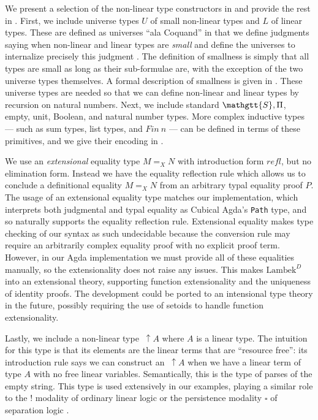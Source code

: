 \documentclass[acmsmall,nonacm]{acmart}
\renewcommand{\Sigma}{\mathgtt{S}}
\newcommand{\theoryabbv}{$\textrm{Lambek}^D$\xspace}
\newcommand{\ltonl}[1]{~\uparrow #1}
\begin{document}
We present a selection of the non-linear type constructors in
 and provide the rest in
\fi.  First,
we include universe types $U$ of small non-linear types and $L$ of linear
types. These are defined as
universes ``ala Coquand'' in that we define judgments saying when
non-linear and linear types are \emph{small} and define the universes to internalize
precisely this judgment \cite{coquandPresheafModel,lmcs:7713}. The definition of
smallness is simply that all types are small as long as their sub-formulae are,
with the exception of the two universe types themselves. A formal
description of smallness is given in
\fi. These universe
types are needed so that we can define non-linear and linear types by recursion on natural
numbers.
Next, we include standard $\Sigma,\Pi$, empty, unit, Boolean, and natural number
types. More complex inductive types --- such as sum types, list types, and
$Fin~n$ --- can be defined in terms of these primitives, and we give their
encoding in \fi.

We use an \emph{extensional} equality type $M =_{X} N$ with introduction form
$refl$, but no elimination form. Instead we have the equality reflection rule
which allows us to conclude a definitional equality $M =_{X} N$ from an
arbitrary typal equality proof $P$.  The usage of an extensional equality type
matches our implementation, which interprets both judgmental and typal equality
as Cubical Agda's \texttt{Path} type, and so naturally supports the equality
reflection rule. Extensional equality makes type checking of our syntax as such
undecidable \citep{Hofmann_1997} because the conversion rule may require an arbitrarily complex
equality proof with no explicit proof term. However, in our Agda implementation we
must provide all of these equalities manually, so the extensionality does
not raise any issues. This makes
\theoryabbv into an extensional theory, supporting function extensionality and
the uniqueness of identity proofs. The development could be ported to an intensional type theory in the future, possibly requiring the use of setoids to handle function extensionality.

Lastly, we include a non-linear type $\ltonl A$ where $A$ is a linear type. The
intuition for this type is that its elements are the linear terms that are
``resource free'': its introduction rule says we can construct an $\ltonl A$
when we have a linear term of type $A$ with no free linear
variables. Semantically, this is the type of parses of the empty string. This
type is used extensively in our examples, playing a similar role to the $!$
modality of ordinary linear logic or the persistence modality $\square$ of
separation logic \cite{girard_linear_1987,jung_higher-order_2016}.
\end{document}
